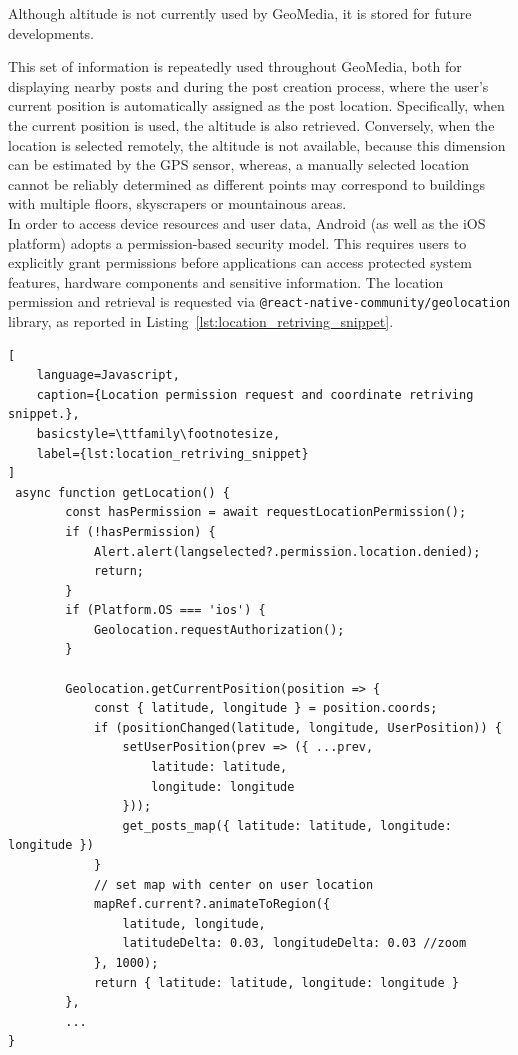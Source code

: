 Although altitude is not currently used by GeoMedia, it is stored for future developments.

This set of information is repeatedly used throughout GeoMedia, both for displaying nearby posts and during the post creation process, where the user's current position is automatically assigned as the post location. Specifically, when the current position is used, the altitude is also retrieved. Conversely, when the location is selected remotely, the altitude is not available, because this dimension can be estimated by the GPS sensor, whereas, a manually selected location cannot be reliably determined as different points may correspond to buildings with multiple floors, skyscrapers or mountainous areas.\\
In order to access device resources and user data, Android (as well as the iOS platform) adopts a permission-based security model. This requires users to explicitly grant permissions before applications can access protected system features, hardware components and sensitive information. 
The location permission and retrieval is requested via \texttt{@react-native-community/geolocation} library, as reported in Listing~\ref{lst:location_retriving_snippet}.


\begin{lstlisting}[
    language=Javascript,
    caption={Location permission request and coordinate retriving snippet.},
    basicstyle=\ttfamily\footnotesize,
    label={lst:location_retriving_snippet}
]
 async function getLocation() {
        const hasPermission = await requestLocationPermission();
        if (!hasPermission) {
            Alert.alert(langselected?.permission.location.denied);
            return;
        }
        if (Platform.OS === 'ios') {
            Geolocation.requestAuthorization();
        }

        Geolocation.getCurrentPosition(position => {
            const { latitude, longitude } = position.coords;
            if (positionChanged(latitude, longitude, UserPosition)) {
                setUserPosition(prev => ({ ...prev, 
                    latitude: latitude,
                    longitude: longitude 
                }));
                get_posts_map({ latitude: latitude, longitude: longitude })
            }
            // set map with center on user location 
            mapRef.current?.animateToRegion({
                latitude, longitude,
                latitudeDelta: 0.03, longitudeDelta: 0.03 //zoom
            }, 1000);
            return { latitude: latitude, longitude: longitude }
        },
        ...
}
\end{lstlisting}

